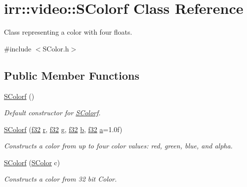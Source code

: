 \hypertarget{classirr_1_1video_1_1SColorf}{}\section{irr\+:\+:video\+:\+:S\+Colorf Class Reference}
\label{classirr_1_1video_1_1SColorf}


Class representing a color with four floats.  




{\ttfamily \#include $<$S\+Color.\+h$>$}

\subsection*{Public Member Functions}
\begin{DoxyCompactItemize}
\item 
\hyperlink{classirr_1_1video_1_1SColorf_a701ea1b449c2aae4a3dd44a13055ac3e}{S\+Colorf} ()
\begin{DoxyCompactList}\small\item\em Default constructor for \hyperlink{classirr_1_1video_1_1SColorf}{S\+Colorf}. \end{DoxyCompactList}\item 
\hyperlink{classirr_1_1video_1_1SColorf_adaf8df839d5174aedba17e61ba28fc64}{S\+Colorf} (\hyperlink{namespaceirr_a0277be98d67dc26ff93b1a6a1d086b07}{f32} \hyperlink{classirr_1_1video_1_1SColorf_aaabdd1e2ef53f24e9dec70d5d531e425}{r}, \hyperlink{namespaceirr_a0277be98d67dc26ff93b1a6a1d086b07}{f32} \hyperlink{classirr_1_1video_1_1SColorf_abcb076ccba5f994d6dca52aed397d59a}{g}, \hyperlink{namespaceirr_a0277be98d67dc26ff93b1a6a1d086b07}{f32} \hyperlink{classirr_1_1video_1_1SColorf_a82d235f32be8c4a5a07acb45abde726e}{b}, \hyperlink{namespaceirr_a0277be98d67dc26ff93b1a6a1d086b07}{f32} \hyperlink{classirr_1_1video_1_1SColorf_add63387fd1fd80d09500b85ae679b050}{a}=1.\+0f)
\begin{DoxyCompactList}\small\item\em Constructs a color from up to four color values\+: red, green, blue, and alpha. \end{DoxyCompactList}\item 
\hyperlink{classirr_1_1video_1_1SColorf_a78bdda49d8605203acc99854cc9722b7}{S\+Colorf} (\hyperlink{classirr_1_1video_1_1SColor}{S\+Color} c)
\begin{DoxyCompactList}\small\item\em Constructs a color from 32 bit Color. \end{DoxyCompactList}\item 

\end{DoxyCompactItemize}
